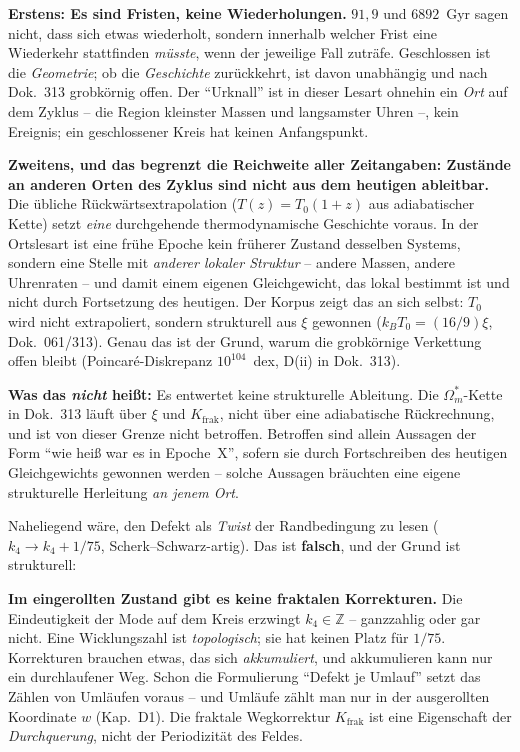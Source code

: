 \documentclass[11pt]{report}
\begin{document}
\textbf{Erstens: Es sind Fristen, keine Wiederholungen.} $91{,}9$
und $6892$~Gyr sagen nicht, dass sich etwas wiederholt, sondern
innerhalb welcher Frist eine Wiederkehr stattfinden \emph{müsste},
wenn der jeweilige Fall zuträfe. Geschlossen ist die
\emph{Geometrie}; ob die \emph{Geschichte} zurückkehrt, ist davon
unabhängig und nach Dok.~313 grobkörnig offen. Der
\enquote{Urknall} ist in dieser Lesart ohnehin ein \emph{Ort} auf
dem Zyklus -- die Region kleinster Massen und langsamster Uhren
--, kein Ereignis; ein geschlossener Kreis hat keinen
Anfangspunkt.

\textbf{Zweitens, und das begrenzt die Reichweite aller
Zeitangaben: Zustände an anderen Orten des Zyklus sind nicht aus
dem heutigen ableitbar.} Die übliche Rückwärtsextrapolation
($T(z) = T_0(1+z)$ aus adiabatischer Kette) setzt \emph{eine}
durchgehende thermodynamische Geschichte voraus. In der
Ortslesart ist eine frühe Epoche kein früherer Zustand desselben
Systems, sondern eine Stelle mit \emph{anderer lokaler Struktur}
-- andere Massen, andere Uhrenraten -- und damit einem eigenen
Gleichgewicht, das lokal bestimmt ist und nicht durch Fortsetzung
des heutigen. Der Korpus zeigt das an sich selbst: $T_0$ wird
nicht extrapoliert, sondern strukturell aus $\xi$ gewonnen
($k_BT_0 = (16/9)\xi$, Dok.~061/313). Genau das ist der Grund,
warum die grobkörnige Verkettung offen bleibt (Poincaré-Diskrepanz
$10^{104}$~dex, D(ii) in Dok.~313).

\noindent \textbf{Was das \emph{nicht} heißt:} Es entwertet keine
strukturelle Ableitung. Die $\Omega_m^{*}$-Kette in Dok.~313 läuft
über $\xi$ und $K_\text{frak}$, nicht über eine adiabatische
Rückrechnung, und ist von dieser Grenze nicht betroffen. Betroffen
sind allein Aussagen der Form \enquote{wie heiß war es in
Epoche~X}, sofern sie durch Fortschreiben des heutigen
Gleichgewichts gewonnen werden -- solche Aussagen bräuchten eine
eigene strukturelle Herleitung \emph{an jenem Ort}.

Naheliegend wäre, den Defekt als \emph{Twist} der Randbedingung
zu lesen ($k_4 \to k_4 + 1/75$, Scherk--Schwarz-artig). Das ist
\textbf{falsch}, und der Grund ist strukturell:

\textbf{Im eingerollten Zustand gibt es keine fraktalen
Korrekturen.} Die Eindeutigkeit der Mode auf dem Kreis erzwingt
$k_4 \in \mathbb{Z}$ -- ganzzahlig oder gar nicht. Eine
Wicklungszahl ist \emph{topologisch}; sie hat keinen Platz für
$1/75$. Korrekturen brauchen etwas, das sich \emph{akkumuliert},
und akkumulieren kann nur ein durchlaufener Weg. Schon die
Formulierung \enquote{Defekt je Umlauf} setzt das Zählen von
Umläufen voraus -- und Umläufe zählt man nur in der ausgerollten
Koordinate $w$ (Kap.~D1). Die fraktale Wegkorrektur
$K_\text{frak}$ ist eine Eigenschaft der \emph{Durchquerung},
nicht der Periodizität des Feldes.
\end{document}
